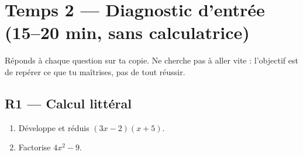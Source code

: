 
\section*{Temps 2 — Diagnostic d'entrée \hfill \normalfont\small(15–20 min, sans calculatrice)}

Réponds à chaque question sur ta copie. Ne cherche pas à aller vite : l'objectif est de repérer ce que tu maîtrises, pas de tout réussir.

\bigskip

\subsection*{R1 — Calcul littéral}

\begin{enumerate}

  \item Développe et réduis $(3x - 2)(x + 5)$.

  \item Factorise $4x^2 - 9$.

\end{enumerate}

